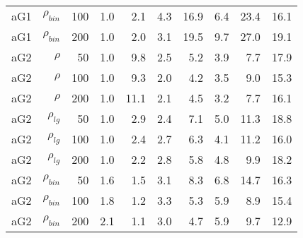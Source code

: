 \documentclass[twoside,11pt]{article}
\begin{document}
\begin{table}
\begin{tabular}{rrrrrrrrrr}
aG1   & $\rho_{bin}$ & 100   & 1.0   & 2.1   & 4.3   & 16.9  & 6.4   & 23.4  & 16.1 \\
aG1   & $\rho_{bin}$ & 200   & 1.0   & 2.0   & 3.1   & 19.5  & 9.7   & 27.0  & 19.1 \bigstrut[b]\\
\hline
aG2   & $\rho$ & 50    & 1.0   & 9.8   & 2.5   & 5.2   & 3.9   & 7.7   & 17.9 \bigstrut[t]\\
aG2   & $\rho$ & 100   & 1.0   & 9.3   & 2.0   & 4.2   & 3.5   & 9.0   & 15.3 \\
aG2   & $\rho$ & 200   & 1.0   & 11.1  & 2.1   & 4.5   & 3.2   & 7.7   & 16.1 \bigstrut[b]\\
\hline
aG2   & $\rho_{lg}$ & 50    & 1.0   & 2.9   & 2.4   & 7.1   & 5.0   & 11.3  & 18.8 \bigstrut[t]\\
aG2   & $\rho_{lg}$ & 100   & 1.0   & 2.4   & 2.7   & 6.3   & 4.1   & 11.2  & 16.0 \\
aG2   & $\rho_{lg}$ & 200   & 1.0   & 2.2   & 2.8   & 5.8   & 4.8   & 9.9   & 18.2 \bigstrut[b]\\
\hline
aG2   & $\rho_{bin}$ & 50    & 1.6   & 1.5   & 3.1   & 8.3   & 6.8   & 14.7  & 16.3 \bigstrut[t]\\
aG2   & $\rho_{bin}$ & 100   & 1.8   & 1.2   & 3.3   & 5.3   & 5.9   & 8.9   & 15.4 \\
aG2   & $\rho_{bin}$ & 200   & 2.1   & 1.1   & 3.0   & 4.7   & 5.9   & 9.7   & 12.9 \bigstrut[b]\\
\hline
\end{tabular}%
\label{varrank1}%
\end{table}%





\end{document}
